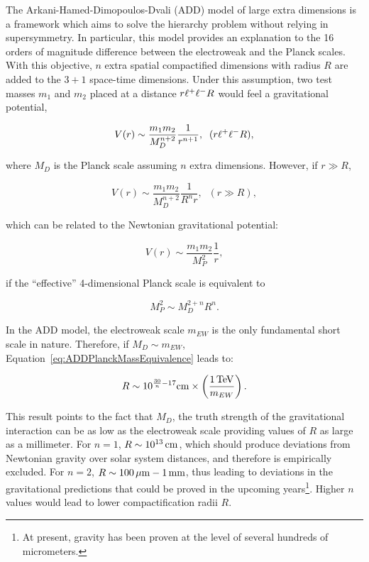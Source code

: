 The Arkani-Hamed-Dimopoulos-Dvali \cite{ArkaniHamed:1998rs} (ADD) model of large extra dimensions is a framework which aims to solve the hierarchy problem without relying in supersymmetry.
In particular, this model provides an explanation to the 16 orders of magnitude difference between the electroweak and the Planck scales.
With this objective, $n$ extra spatial compactified dimensions with radius $R$ are added to the $3+1$ space-time dimensions.
Under this assumption, two test masses $m_1$ and $m_2$ placed at a distance $r\muchless R$ would feel a gravitational potential,

\begin{equation}
V(r) \sim \frac{m_1 m_2}{M^{n+2}_D} \frac{1}{r^{n+1}},\;\; (r\muchless R),
\label{eq:ADDPotentialrSmall}
\end{equation}

\noindent where $M_D$ is the Planck scale assuming $n$ extra dimensions.
However, if $r\gg R$,

\begin{equation}
V(r) \sim \frac{m_1 m_2}{M^{n+2}_D} \frac{1}{R^n r},\;\; (r\gg R),
\label{eq:ADDPotentialrBig}
\end{equation}

\noindent which can be related to the Newtonian gravitational potential:

\begin{equation}
V(r) \sim \frac{m_1 m_2}{M^2_P} \frac{1}{r},
\label{eq:ADDPotentialNewton}
\end{equation}

\noindent if the ``effective'' 4-dimensional Planck scale is equivalent to

\begin{equation}
M_P^2 \sim M_D^{2+n} R^n.
\label{eq:ADDPlanckMassEquivalence}
\end{equation}

In the ADD model, the electroweak scale $m_{EW}$ is the only fundamental short scale in nature.
Therefore, if $M_D \sim m_{EW}$, Equation~\ref{eq:ADDPlanckMassEquivalence} leads to:

\begin {equation}
R \sim 10^{\frac{30}{n}-17} \unit[]{cm} \times \left(\frac{\unit[1]{TeV}}{m_{EW}}\right).
\label{eq:ADDRRelation}
\end{equation}

This result points to the fact that $M_D$, the truth strength of the gravitational interaction can be as low as the electroweak scale providing values of $R$ as large as a millimeter.
For $n=1$, $R\sim \unit[10^{13}]{cm}$, which should produce deviations from Newtonian gravity over solar system distances, and therefore is empirically excluded.
For $n=2$, $R\sim \unit[100]{\mu m} - \unit[1]{mm}$, thus leading to deviations in the gravitational predictions that could be proved in the upcoming years\footnote{At present, gravity has been proven at the level of several hundreds of micrometers.}.
Higher $n$ values would lead to lower compactification radii $R$.

